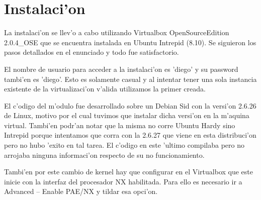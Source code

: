 \section{Instalaci'on}
La instalaci'on se llev'o a cabo utilizando Virtualbox OpenSourceEdition 2.0.4\_OSE que se encuentra instalada en Ubuntu Intrepid (8.10). Se siguieron los pasos detallados en el enunciado y todo fue satisfactorio.

El nombre de usuario para acceder a la instalaci'on es 'diego' y su password tambi'en es 'diego'. Esto es solamente casual y al intentar tener una sola instancia existente de la virtualizaci'on v'alida utilizamos la primer creada.

El c'odigo del m'odulo fue desarrollado sobre un Debian Sid con la versi'on 2.6.26 de Linux, motivo por el cual tuvimos que instalar dicha versi'on en la m'aquina virtual. Tambi'en podr'an notar que la misma no corre Ubuntu Hardy sino Intrepid porque intentamos que corra con la 2.6.27 que viene en esta distribuci'on pero no hubo 'exito en tal tarea. El c'odigo en este 'ultimo compilaba pero no arrojaba ninguna informaci'on respecto de su no funcionamiento.

Tambi'en por este cambio de kernel hay que configurar en el Virtualbox que este inicie con la interfaz del procesador NX habilitada. Para ello es necesario ir a Advanced -- Enable PAE/NX y tildar esa opci'on.
